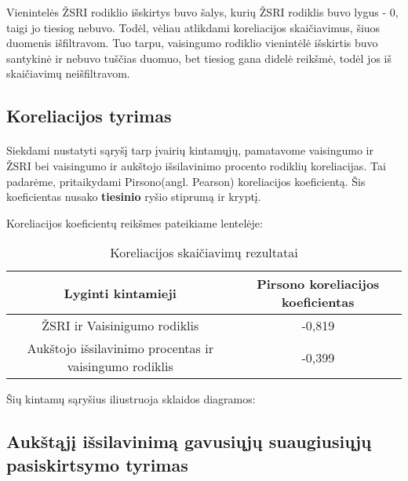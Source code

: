 Vienintelės ŽSRI rodiklio išskirtys buvo šalys, kurių ŽSRI rodiklis buvo lygus - 0, taigi jo tiesiog nebuvo. Todėl, vėliau atlikdami koreliacijos skaičiavimus, šiuos duomenis išfiltravom. Tuo tarpu, vaisingumo rodiklio vienintėlė išskirtis buvo santykinė ir nebuvo tuščias duomuo, bet tiesiog gana didelė reikšmė, todėl jos iš skaičiavimų neišfiltravom.

\pagebreak


\subsection{Koreliacijos tyrimas}
\paragraph{} Siekdami nustatyti sąryšį tarp įvairių kintamųjų, pamatavome vaisingumo ir ŽSRI bei vaisingumo ir aukštojo išsilavinimo procento rodiklių koreliacijas. Tai padarėme, pritaikydami Pirsono(angl. Pearson) koreliacijos koeficientą. Šis koeficientas nusako \textbf{tiesinio} ryšio stiprumą ir kryptį.

Koreliacijos koeficientų reikšmes pateikiame lentelėje:
\begin{table}[H]
\begin{center}
    \caption{Koreliacijos skaičiavimų rezultatai}
    \begin{tabular}{|c|c|}
        \hline
        \textbf{Lyginti kintamieji} & \textbf{Pirsono koreliacijos koeficientas} \\\hline
        ŽSRI ir Vaisinigumo rodiklis & -0,819 \\\hline
        Aukštojo išsilavinimo procentas ir vaisingumo rodiklis & -0,399 \\\hline
    \end{tabular}
\end{center}
\end{table}

Šių kintamų sąryšius iliustruoja sklaidos diagramos:
\begin{multicols}{2}
\end{multicols}

\pagebreak

\subsection{Aukštąjį išsilavinimą gavusiųjų suaugiusiųjų pasiskirtsymo tyrimas} 

